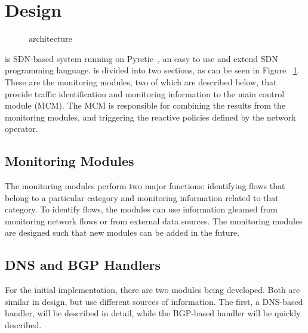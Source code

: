 \section{Design}

\begin{figure}
    \centering
    \caption{\system{} architecture}
    \label{fig:architecture}
\end{figure}


\system{} is SDN-based system running on Pyretic~\cite{pyretic}, an easy to use and extend SDN programming language.
\system{} is divided into two sections, as can be seen in Figure~
\ref{fig:architecture}. These are the monitoring modules, two of which are described below, that provide traffic identification and monitoring information to the main control module (MCM). The MCM is responsible for combining the results from the monitoring modules, and triggering the reactive policies defined by the network operator.

\subsection{Monitoring Modules}
The monitoring modules perform two major functions: identifying flows that belong to a particular category and monitoring information related to that category. To identify flows, the modules can use information gleamed from monitoring network flows or from external data sources. The monitoring modules are designed such that new modules can be added in the future.

\subsection{DNS and BGP Handlers}
For the initial implementation, there are two modules being developed. Both are similar in design, but use different sources of information. The first, a DNS-based handler, will be described in detail, while the BGP-based handler will be quickly described.


